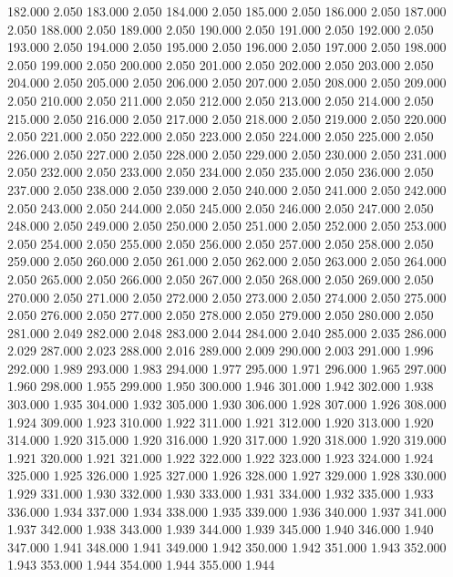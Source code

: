 182.000 2.050 
183.000 2.050 
184.000 2.050 
185.000 2.050 
186.000 2.050 
187.000 2.050 
188.000 2.050 
189.000 2.050 
190.000 2.050 
191.000 2.050 
192.000 2.050 
193.000 2.050 
194.000 2.050 
195.000 2.050 
196.000 2.050 
197.000 2.050 
198.000 2.050 
199.000 2.050 
200.000 2.050 
201.000 2.050 
202.000 2.050 
203.000 2.050 
204.000 2.050 
205.000 2.050 
206.000 2.050 
207.000 2.050 
208.000 2.050 
209.000 2.050 
210.000 2.050 
211.000 2.050 
212.000 2.050 
213.000 2.050 
214.000 2.050 
215.000 2.050 
216.000 2.050 
217.000 2.050 
218.000 2.050 
219.000 2.050 
220.000 2.050 
221.000 2.050 
222.000 2.050 
223.000 2.050 
224.000 2.050 
225.000 2.050 
226.000 2.050 
227.000 2.050 
228.000 2.050 
229.000 2.050 
230.000 2.050 
231.000 2.050 
232.000 2.050 
233.000 2.050 
234.000 2.050 
235.000 2.050 
236.000 2.050 
237.000 2.050 
238.000 2.050 
239.000 2.050 
240.000 2.050 
241.000 2.050 
242.000 2.050 
243.000 2.050 
244.000 2.050 
245.000 2.050 
246.000 2.050 
247.000 2.050 
248.000 2.050 
249.000 2.050 
250.000 2.050 
251.000 2.050 
252.000 2.050 
253.000 2.050 
254.000 2.050 
255.000 2.050 
256.000 2.050 
257.000 2.050 
258.000 2.050 
259.000 2.050 
260.000 2.050 
261.000 2.050 
262.000 2.050 
263.000 2.050 
264.000 2.050 
265.000 2.050 
266.000 2.050 
267.000 2.050 
268.000 2.050 
269.000 2.050 
270.000 2.050 
271.000 2.050 
272.000 2.050 
273.000 2.050 
274.000 2.050 
275.000 2.050 
276.000 2.050 
277.000 2.050 
278.000 2.050 
279.000 2.050 
280.000 2.050 
281.000 2.049 
282.000 2.048 
283.000 2.044 
284.000 2.040 
285.000 2.035 
286.000 2.029 
287.000 2.023 
288.000 2.016 
289.000 2.009 
290.000 2.003 
291.000 1.996 
292.000 1.989 
293.000 1.983 
294.000 1.977 
295.000 1.971 
296.000 1.965 
297.000 1.960 
298.000 1.955 
299.000 1.950 
300.000 1.946 
301.000 1.942 
302.000 1.938 
303.000 1.935 
304.000 1.932 
305.000 1.930 
306.000 1.928 
307.000 1.926 
308.000 1.924 
309.000 1.923 
310.000 1.922 
311.000 1.921 
312.000 1.920 
313.000 1.920 
314.000 1.920 
315.000 1.920 
316.000 1.920 
317.000 1.920 
318.000 1.920 
319.000 1.921 
320.000 1.921 
321.000 1.922 
322.000 1.922 
323.000 1.923 
324.000 1.924 
325.000 1.925 
326.000 1.925 
327.000 1.926 
328.000 1.927 
329.000 1.928 
330.000 1.929 
331.000 1.930 
332.000 1.930 
333.000 1.931 
334.000 1.932 
335.000 1.933 
336.000 1.934 
337.000 1.934 
338.000 1.935 
339.000 1.936 
340.000 1.937 
341.000 1.937 
342.000 1.938 
343.000 1.939 
344.000 1.939 
345.000 1.940 
346.000 1.940 
347.000 1.941 
348.000 1.941 
349.000 1.942 
350.000 1.942 
351.000 1.943 
352.000 1.943 
353.000 1.944 
354.000 1.944 
355.000 1.944 
